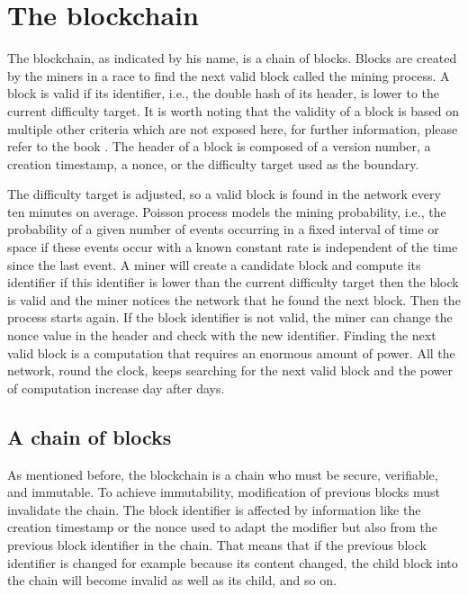 \section{The blockchain}

The blockchain, as indicated by his name, is a chain of blocks. Blocks are
created by the miners in a race to find the next valid block called the mining
process. A block is valid if its identifier, i.e., the double hash of its
header, is lower to the current difficulty target. It is worth noting that the
validity of a block is based on multiple other criteria which are not exposed
here, for further information, please refer to the book .
The header of a block is composed of a version number, a creation timestamp, a
nonce, or the difficulty target used as the boundary.

The difficulty target is adjusted, so a valid block is found in the network
every ten minutes on average. Poisson process models the mining probability,
i.e., the probability of a given number of events occurring in a fixed interval
of time or space if these events occur with a known constant rate is independent
of the time since the last event. A miner will create a candidate block and
compute its identifier if this identifier is lower than the current difficulty
target then the block is valid and the miner notices the network that he found
the next block. Then the process starts again. If the block identifier is not
valid, the miner can change the nonce value in the header and check with the new
identifier. Finding the next valid block is a computation that requires an
enormous amount of power. All the network, round the clock, keeps searching for
the next valid block and the power of computation increase day after days.

\subsection{A chain of blocks}

As mentioned before, the blockchain is a chain who must be secure, verifiable,
and immutable. To achieve immutability, modification of previous blocks must
invalidate the chain. The block identifier is affected by information like the
creation timestamp or the nonce used to adapt the modifier but also from the
previous block identifier in the chain. That means that if the previous block
identifier is changed for example because its content changed, the child block
into the chain will become invalid as well as its child, and so on.

